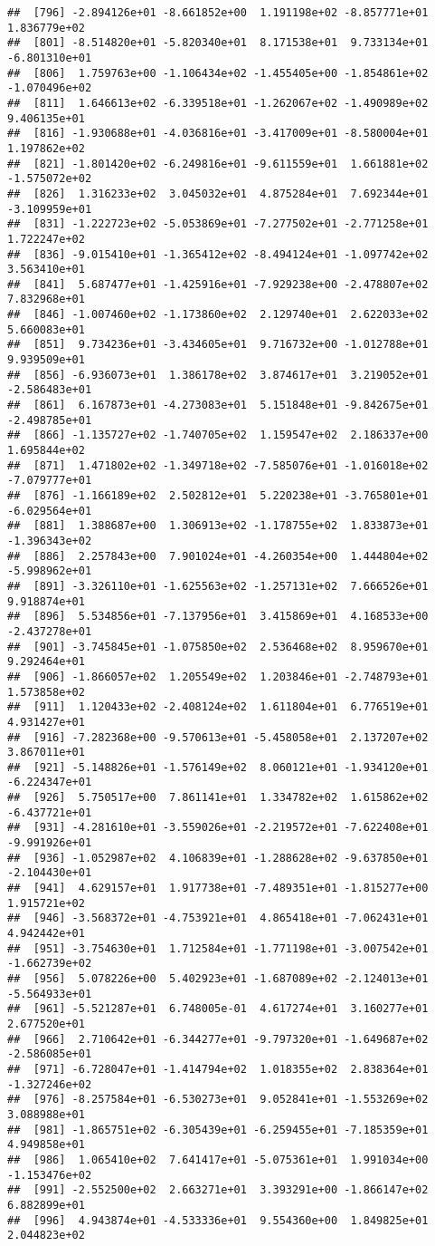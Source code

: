 \documentclass[]{book}
\begin{document}
\begin{verbatim}
##  [796] -2.894126e+01 -8.661852e+00  1.191198e+02 -8.857771e+01  1.836779e+02
##  [801] -8.514820e+01 -5.820340e+01  8.171538e+01  9.733134e+01 -6.801310e+01
##  [806]  1.759763e+00 -1.106434e+02 -1.455405e+00 -1.854861e+02 -1.070496e+02
##  [811]  1.646613e+02 -6.339518e+01 -1.262067e+02 -1.490989e+02  9.406135e+01
##  [816] -1.930688e+01 -4.036816e+01 -3.417009e+01 -8.580004e+01  1.197862e+02
##  [821] -1.801420e+02 -6.249816e+01 -9.611559e+01  1.661881e+02 -1.575072e+02
##  [826]  1.316233e+02  3.045032e+01  4.875284e+01  7.692344e+01 -3.109959e+01
##  [831] -1.222723e+02 -5.053869e+01 -7.277502e+01 -2.771258e+01  1.722247e+02
##  [836] -9.015410e+01 -1.365412e+02 -8.494124e+01 -1.097742e+02  3.563410e+01
##  [841]  5.687477e+01 -1.425916e+01 -7.929238e+00 -2.478807e+02  7.832968e+01
##  [846] -1.007460e+02 -1.173860e+02  2.129740e+01  2.622033e+02  5.660083e+01
##  [851]  9.734236e+01 -3.434605e+01  9.716732e+00 -1.012788e+01  9.939509e+01
##  [856] -6.936073e+01  1.386178e+02  3.874617e+01  3.219052e+01 -2.586483e+01
##  [861]  6.167873e+01 -4.273083e+01  5.151848e+01 -9.842675e+01 -2.498785e+01
##  [866] -1.135727e+02 -1.740705e+02  1.159547e+02  2.186337e+00  1.695844e+02
##  [871]  1.471802e+02 -1.349718e+02 -7.585076e+01 -1.016018e+02 -7.079777e+01
##  [876] -1.166189e+02  2.502812e+01  5.220238e+01 -3.765801e+01 -6.029564e+01
##  [881]  1.388687e+00  1.306913e+02 -1.178755e+02  1.833873e+01 -1.396343e+02
##  [886]  2.257843e+00  7.901024e+01 -4.260354e+00  1.444804e+02 -5.998962e+01
##  [891] -3.326110e+01 -1.625563e+02 -1.257131e+02  7.666526e+01  9.918874e+01
##  [896]  5.534856e+01 -7.137956e+01  3.415869e+01  4.168533e+00 -2.437278e+01
##  [901] -3.745845e+01 -1.075850e+02  2.536468e+02  8.959670e+01  9.292464e+01
##  [906] -1.866057e+02  1.205549e+02  1.203846e+01 -2.748793e+01  1.573858e+02
##  [911]  1.120433e+02 -2.408124e+02  1.611804e+01  6.776519e+01  4.931427e+01
##  [916] -7.282368e+00 -9.570613e+01 -5.458058e+01  2.137207e+02  3.867011e+01
##  [921] -5.148826e+01 -1.576149e+02  8.060121e+01 -1.934120e+01 -6.224347e+01
##  [926]  5.750517e+00  7.861141e+01  1.334782e+02  1.615862e+02 -6.437721e+01
##  [931] -4.281610e+01 -3.559026e+01 -2.219572e+01 -7.622408e+01 -9.991926e+01
##  [936] -1.052987e+02  4.106839e+01 -1.288628e+02 -9.637850e+01 -2.104430e+01
##  [941]  4.629157e+01  1.917738e+01 -7.489351e+01 -1.815277e+00  1.915721e+02
##  [946] -3.568372e+01 -4.753921e+01  4.865418e+01 -7.062431e+01  4.942442e+01
##  [951] -3.754630e+01  1.712584e+01 -1.771198e+01 -3.007542e+01 -1.662739e+02
##  [956]  5.078226e+00  5.402923e+01 -1.687089e+02 -2.124013e+01 -5.564933e+01
##  [961] -5.521287e+01  6.748005e-01  4.617274e+01  3.160277e+01  2.677520e+01
##  [966]  2.710642e+01 -6.344277e+01 -9.797320e+01 -1.649687e+02 -2.586085e+01
##  [971] -6.728047e+01 -1.414794e+02  1.018355e+02  2.838364e+01 -1.327246e+02
##  [976] -8.257584e+01 -6.530273e+01  9.052841e+01 -1.553269e+02  3.088988e+01
##  [981] -1.865751e+02 -6.305439e+01 -6.259455e+01 -7.185359e+01  4.949858e+01
##  [986]  1.065410e+02  7.641417e+01 -5.075361e+01  1.991034e+00 -1.153476e+02
##  [991] -2.552500e+02  2.663271e+01  3.393291e+00 -1.866147e+02  6.882899e+01
##  [996]  4.943874e+01 -4.533336e+01  9.554360e+00  1.849825e+01  2.044823e+02
\end{verbatim}
\end{document}

